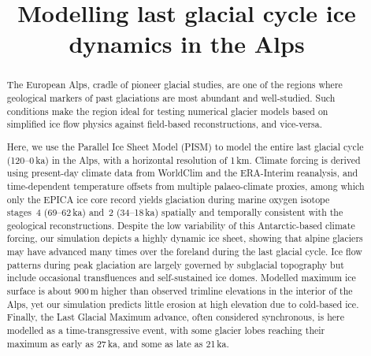 \documentclass[tc, manuscript]{copernicus}
\title{Modelling last glacial cycle ice dynamics in the Alps}
\affil[1]{Laboratory of Hydraulics, Hydrology and Glaciology,
          ETH Zürich, Switzerland}
\affil[2]{Laboratory of Ion Beam Physics, ETH Zürich, Switzerland}
\affil[3]{Institute of Earth and Environmental Sciences,
          University of Freiburg, Germany}
\begin{document}


\maketitle

\begin{abstract}

    The European Alps, cradle of pioneer glacial studies, are one of the
    regions where geological markers of past glaciations are most abundant and
    well-studied. Such conditions make the region ideal for testing numerical
    glacier models based on simplified ice flow physics against field-based
    reconstructions, and vice-versa.

    Here, we use the Parallel Ice Sheet Model (PISM) to model the entire last
    glacial cycle (120--0\,ka) in the Alps, with a horizontal resolution of
    1\,km. Climate forcing is derived using present-day climate data from
    WorldClim and the ERA-Interim reanalysis, and time-dependent temperature
    offsets from multiple palaeo-climate proxies, among which only the EPICA ice
    core record yields glaciation during marine oxygen isotope stages~4
    (69--62\,ka) and~2 (34--18\,ka) spatially and temporally consistent with
    the geological reconstructions.
    Despite the low variability of this Antarctic-based climate forcing, our
    simulation depicts a highly dynamic ice sheet, showing that alpine glaciers
    may have advanced many times over the foreland during the last glacial
    cycle. Ice flow patterns during peak glaciation are largely governed by
    subglacial topography but include occasional transfluences and
    self-sustained ice domes. Modelled maximum ice surface is about 900\,m
    higher than observed trimline elevations in the interior of the Alps, yet
    our simulation predicts little erosion at high elevation due to cold-based
    ice. Finally, the Last
    Glacial Maximum advance, often considered synchronous, is here modelled as
    a time-transgressive event, with some glacier lobes reaching their maximum
    as early as 27\,ka, and some as late as 21\,ka.

\end{abstract}



\introduction
\label{sec:intro}
\end{document}
